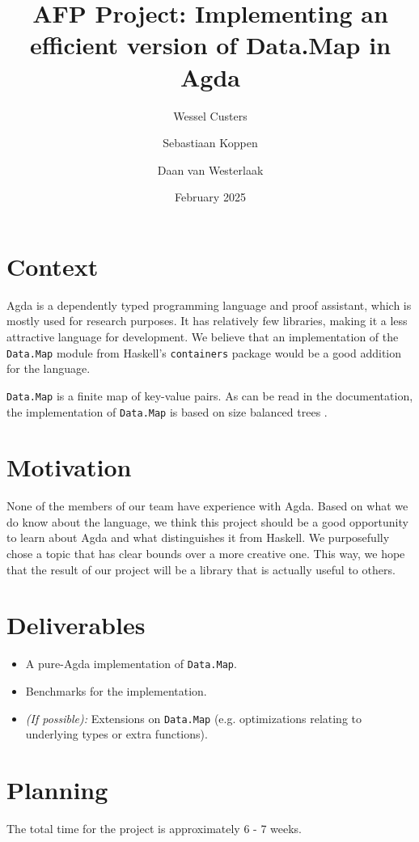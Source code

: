 \documentclass[a4paper,UKenglish,cleveref, autoref, thm-restate]{template/lipics-v2021}
\title{AFP Project: Implementing an efficient version of Data.Map in Agda}
\author{Wessel Custers}{Utrecht University, Netherlands}{}{}{}
\author{Sebastiaan Koppen}{Utrecht University, Netherlands}{}{}{}
\author{Daan van Westerlaak}{Utrecht University, Netherlands}{}{}{}
\date{February 2025}
\begin{document}
\maketitle

\section{Context}
Agda is a dependently typed programming language and proof assistant, which is mostly used for research purposes.
It has relatively few libraries, making it a less attractive language for development.
We believe that an implementation of the \texttt{Data.Map} module from Haskell's \texttt{containers} package would be a good addition for the language.

\texttt{Data.Map} is a finite map of key-value pairs. As can be read in the documentation, the implementation of \texttt{Data.Map} is based on size balanced trees \cite{adams1993functional, nievergelt1972binary}.

\section{Motivation}
None of the members of our team have experience with Agda. 
Based on what we do know about the language, we think this project should be a good opportunity to learn about Agda and what distinguishes it from Haskell.
We purposefully chose a topic that has clear bounds over a more creative one.
This way, we hope that the result of our project will be a library that is actually useful to others.

\section{Deliverables}
\begin{itemize}
    \item A pure-Agda implementation of \texttt{Data.Map}.
    \item Benchmarks for the implementation.
    \item \textit{(If possible):} Extensions on \texttt{Data.Map} (e.g. optimizations relating to underlying types or extra functions).
\end{itemize}

\section{Planning}
The total time for the project is approximately 6 - 7 weeks.
\end{document}
